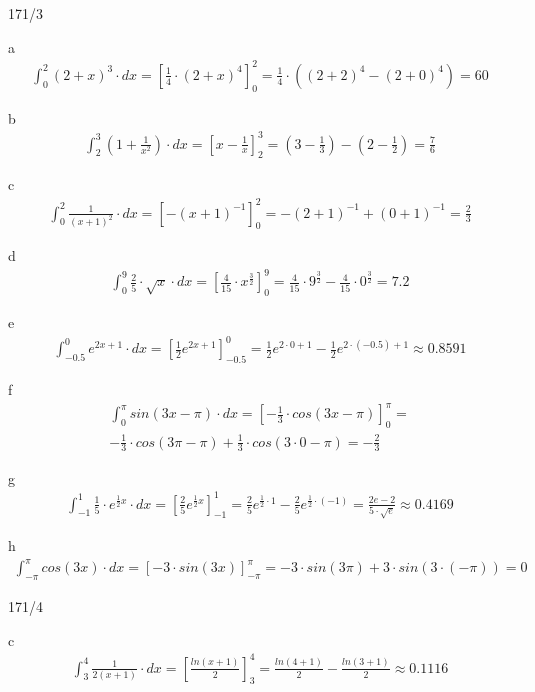 \begin{exercise}{171/3}
  \item [a]
  \begin{gather*}
    \int_0^2 (2 + x)^3 \cdot dx = \left[\frac{1}{4} \cdot (2 + x)^4\right]_0^2 = \frac{1}{4} \cdot ((2 + 2)^4 - (2 + 0)^4) = 60
  \end{gather*}
  \item [b]
  \begin{gather*}
    \int_2^3 (1 + \frac{1}{x^2}) \cdot dx = \left[x - \frac{1}{x}\right]_2^3 = (3 - \frac{1}{3}) - (2 - \frac{1}{2}) = \frac{7}{6}
  \end{gather*}
  \item [c]
  \begin{gather*}
    \int_0^2 \frac{1}{(x + 1)^2} \cdot dx = \left[-(x + 1)^{-1}\right]_0^2 = -(2 + 1)^{-1} + (0 + 1)^{-1} = \frac{2}{3}
  \end{gather*}
  \item [d]
  \begin{gather*}
    \int_0^9 \frac{2}{5} \cdot \sqrt{x} \cdot dx = [\frac{4}{15} \cdot x^{\frac{3}{2}}]_0^9 = \frac{4}{15} \cdot 9^{\frac{3}{2}} - \frac{4}{15} \cdot 0^{\frac{3}{2}} = 7.2
  \end{gather*}
  \item [e]
  \begin{gather*}
    \int_{-0.5}^0 e^{2x + 1} \cdot dx = \left[\frac{1}{2}e^{2x + 1}\right]_{-0.5}^0 = \frac{1}{2}e^{2 \cdot 0 + 1} - \frac{1}{2}e^{2 \cdot (-0.5) + 1} \approx 0.8591
  \end{gather*}
  \item [f]
  \begin{gather*}
    \int_0^\pi sin(3x - \pi) \cdot dx = \left[-\frac{1}{3} \cdot cos(3x - \pi)\right]_0^\pi = \\ -\frac{1}{3} \cdot cos(3\pi - \pi) + \frac{1}{3} \cdot cos(3 \cdot 0 - \pi) = -\frac{2}{3}
  \end{gather*}
  \item [g]
  \begin{gather*}
    \int_{-1}^1 \frac{1}{5} \cdot e^{\frac{1}{2}x} \cdot dx = \left[\frac{2}{5}e^{\frac{1}{2}x}\right]_{-1}^1 = \frac{2}{5}e^{\frac{1}{2} \cdot 1} - \frac{2}{5}e^{\frac{1}{2} \cdot (-1)} = \frac{2e - 2}{5 \cdot \sqrt{e}} \approx 0.4169
  \end{gather*}
  \item [h]
  \begin{gather*}
    \int_{-\pi}^\pi cos(3x) \cdot dx = \left[-3 \cdot sin(3x)\right]_{-\pi}^\pi = -3 \cdot sin(3\pi) + 3 \cdot sin(3 \cdot (-\pi)) = 0
  \end{gather*}
\end{exercise}
\begin{exercise}{171/4}
  \item [c]
  \begin{gather*}
    \int_3^4 \frac{1}{2(x + 1)} \cdot dx = \left[\frac{ln(x + 1)}{2}\right]_3^4 = \frac{ln(4 + 1)}{2} - \frac{ln(3 + 1)}{2} \approx 0.1116
  \end{gather*}
\end{exercise}
